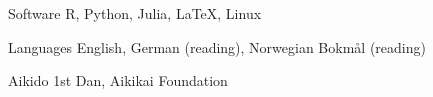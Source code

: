 

\begin{cvskills}

  \cvskill
    {Software} %
    {R, Python, Julia, \LaTeX, Linux} %

  \cvskill
    {Languages} %
    {English, German (reading), Norwegian Bokmål (reading)} %

  \cvskill
    {Aikido} %
    {1st Dan, Aikikai Foundation} %


\end{cvskills}
